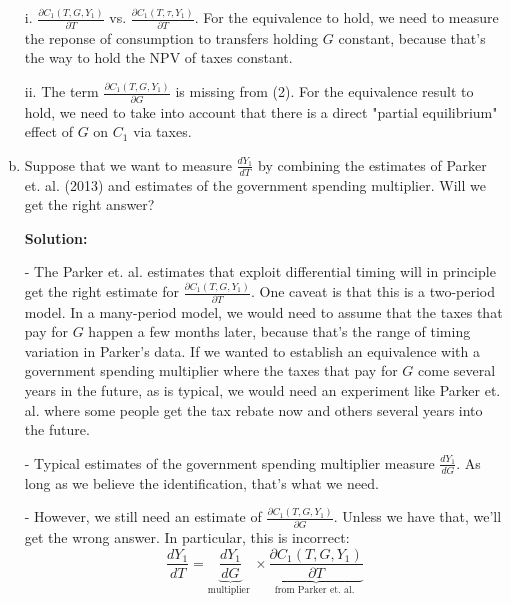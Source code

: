 \documentclass[11pt]{extarticle}
\theoremstyle{plain}
\theoremstyle{definition}
\begin{document}
\begin{enumerate}[(a)]
i. $\frac{\partial C_1\left(T, G, Y_1\right)}{\partial T}$ vs. $\frac{\partial C_1\left(T, \tau, Y_1\right)}{\partial T}$. For the equivalence to hold, we need to measure the reponse of consumption to transfers holding $G$ constant, because that's the way to hold the NPV of taxes constant.

ii. The term $\frac{\partial C_1\left(T, G, Y_1\right)}{\partial G}$ is missing from (2). For the equivalence result to hold, we need to take into account that there is a direct "partial equilibrium" effect of $G$ on $C_1$ via taxes.


\item Suppose that we want to measure $\frac{d Y_1}{d T}$ by combining the estimates of Parker et. al. (2013) and estimates of the government spending multiplier. Will we get the right answer?

\textbf{Solution:}

- The Parker et. al. estimates that exploit differential timing will in principle get the right estimate for $\frac{\partial C_1\left(T, G, Y_1\right)}{\partial T}$. One caveat is that this is a two-period model. In a many-period model, we would need to assume that the taxes that pay for $G$ happen a few months later, because that's the range of timing variation in Parker's data. If we wanted to establish an equivalence with a government spending multiplier where the taxes that pay for $G$ come several years in the future, as is typical, we would need an experiment like Parker et. al. where some people get the tax rebate now and others several years into the future.

- Typical estimates of the government spending multiplier measure $\frac{d Y_1}{d G}$. As long as we believe the identification, that's what we need.

- However, we still need an estimate of $\frac{\partial C_1\left(T, G, Y_1\right)}{\partial G}$. Unless we have that, we'll get the wrong answer. In particular, this is incorrect:
$$
\frac{d Y_1}{d T}=\underbrace{\frac{d Y_1}{d G}}_{\text {multiplier }} \times \underbrace{\frac{\partial C_1\left(T, G, Y_1\right)}{\partial T}}_{\text {from Parker et. al. }}
$$

\end{enumerate}
\end{document}
